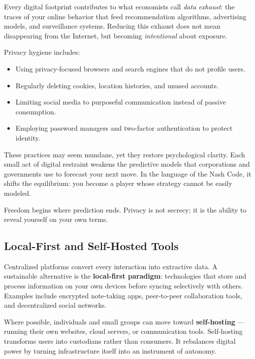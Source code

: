 \documentclass[12pt,twoside]{book}
\begin{document}
Every digital footprint contributes to what economists call \emph{data exhaust}: the traces of your online behavior that feed recommendation algorithms, advertising models, and surveillance systems.  
Reducing this exhaust does not mean disappearing from the Internet, but becoming \emph{intentional} about exposure.

Privacy hygiene includes:
\begin{itemize}
  \item Using privacy-focused browsers and search engines that do not profile users.
  \item Regularly deleting cookies, location histories, and unused accounts.
  \item Limiting social media to purposeful communication instead of passive consumption.
  \item Employing password managers and two-factor authentication to protect identity.
\end{itemize}

These practices may seem mundane, yet they restore psychological clarity.  
Each small act of digital restraint weakens the predictive models that corporations and governments use to forecast your next move.  
In the language of the Nash Code, it shifts the equilibrium: you become a player whose strategy cannot be easily modeled.\\

\begin{keyidea}
Freedom begins where prediction ends.  
Privacy is not secrecy; it is the ability to reveal yourself on your own terms.
\end{keyidea}

\subsection*{Local-First and Self-Hosted Tools}

Centralized platforms convert every interaction into extractive data.  
A sustainable alternative is the \textbf{local-first paradigm}: technologies that store and process information on your own devices before syncing selectively with others.  
Examples include encrypted note-taking apps, peer-to-peer collaboration tools, and decentralized social networks.  

Where possible, individuals and small groups can move toward \textbf{self-hosting} --- running their own websites, cloud servers, or communication tools.  
Self-hosting transforms users into custodians rather than consumers.  
It rebalances digital power by turning infrastructure itself into an instrument of autonomy.
\end{document}
